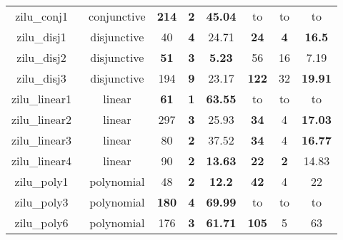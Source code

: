 \begin{table}[t]
\begin{tabular}{l c | c c c | c c c |}
\multicolumn{1}{|c|}{zilu\_conj1~\cite{zilu:repo}}				&conjunctive	&\textbf{214}	&\textbf{2}	&\textbf{45.04}		&to				&to			&to			\\
\multicolumn{1}{|c|}{zilu\_disj1~\cite{zilu:repo}}				&disjunctive	&40 	&\textbf{4} 		&24.71   			&\textbf{24} 	&\textbf{4} &\textbf{16.5} 		\\
\multicolumn{1}{|c|}{zilu\_disj2~\cite{zilu:repo}}				&disjunctive	&\textbf{51} &\textbf{3} 	&\textbf{5.23}		&56 			&16 		&7.19  		\\
\multicolumn{1}{|c|}{zilu\_disj3~\cite{zilu:repo}}				&disjunctive	&194 	&\textbf{9} 		&23.17				&\textbf{122} 	&32  		&\textbf{19.91}	\\
\multicolumn{1}{|c|}{zilu\_linear1~\cite{zilu:repo}}			&linear			&\textbf{61}&\textbf{1}		&\textbf{63.55}		&to				&to			&to  \\ 
\multicolumn{1}{|c|}{zilu\_linear2~\cite{zilu:repo}}			&linear			&297	&\textbf{3} 		&25.93    			&\textbf{34}	&4 			&\textbf{17.03}  \\ 
\multicolumn{1}{|c|}{zilu\_linear3~\cite{zilu:repo}}			&linear			&80		&\textbf{2}			&37.52	      		&\textbf{34}	&4 			&\textbf{16.77}  \\ 
\multicolumn{1}{|c|}{zilu\_linear4~\cite{zilu:repo}}			&linear 		&90 	&\textbf{2} 		&\textbf{13.63}     &\textbf{22}	&\textbf{2}	&14.83  \\ 
\multicolumn{1}{|c|}{zilu\_poly1~\cite{zilu:repo}}				&polynomial		&48		&\textbf{2}			&\textbf{12.2}	    &\textbf{42}	&4			&22  \\
\multicolumn{1}{|c|}{zilu\_poly3~\cite{zilu:repo}}				&polynomial		&\textbf{180}	&\textbf{4} &\textbf{69.99}    	&to				&to			&to  \\ 
\multicolumn{1}{|c|}{zilu\_poly6~\cite{zilu:repo}}				&polynomial		&176	&\textbf{3}			&\textbf{61.71}		&\textbf{105}	&5			&63	  \\

\hline
\end{tabular}
\label{tbl:stats}
\end{table}

